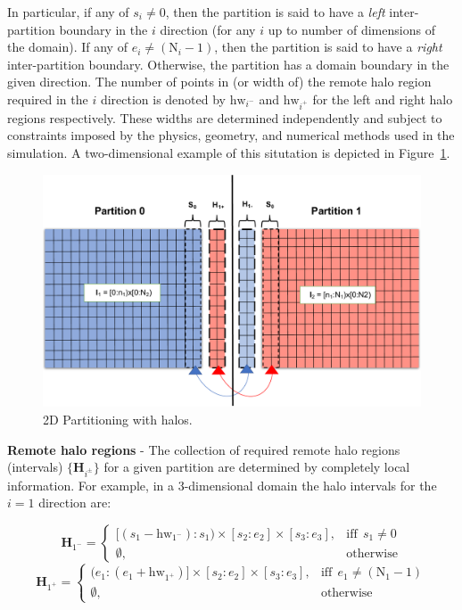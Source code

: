 \documentclass[11pt]{article}
\begin{document}
In particular, if any of $s_i \neq 0$, then the partition is said to have a \textit{left} inter-partition boundary in the $i$ direction (for any $i$ up to number of dimensions of the domain).  If any of $e_i \neq (\text{N}_i-1)$, then the partition is said to have a \textit{right} inter-partition boundary. Otherwise, the partition has a domain boundary in the given direction. The number of points in (or width of) the remote halo region required in the $i$ direction is denoted by $\text{hw}_{i^{-}}$ and $\text{hw}_{i^{+}}$ for the left and right halo regions respectively. These widths are determined independently and subject to constraints imposed by the physics, geometry, and numerical methods used in the simulation.  A two-dimensional example of this situtation is depicted in Figure~\ref{fig:2DPartAndHalos}.

\begin{figure}[h]
\begin{center}
\includegraphics[width=\textwidth]{Figures/PartAndHalos}
\vspace{-20pt}
\caption{2D Partitioning with halos. }\label{fig:2DPartAndHalos}
\end{center}
\end{figure}

\textbf{Remote halo regions} - The collection of required remote halo regions (intervals) $\{\textbf{H}_{i^\pm}\}$ for a given partition are determined by completely local information. For example, in a 3-dimensional domain the halo intervals for the $i=1$ direction are:
 
\begin{equation*} 
\textbf{H}_{1^-} =
\begin{cases}
[(s_1 - \text{hw}_{1^-}):s_1)\times[s_2:e_2]\times[s_3:e_3], & \text{iff}~~s_{1}\neq 0 \\
\emptyset, & \text{otherwise}
\end{cases} 
\end{equation*}
\begin{equation*}
\textbf{H}_{1^+} =
\begin{cases}
(e_1:(e_1 + \text{hw}_{1^+})]\times[s_2:e_2]\times[s_3:e_3], & \text{iff}~~e_{1}\neq (\text{N}_1-1) \\
\emptyset, & \text{otherwise}
\end{cases}
\end{equation*}
\end{document}
